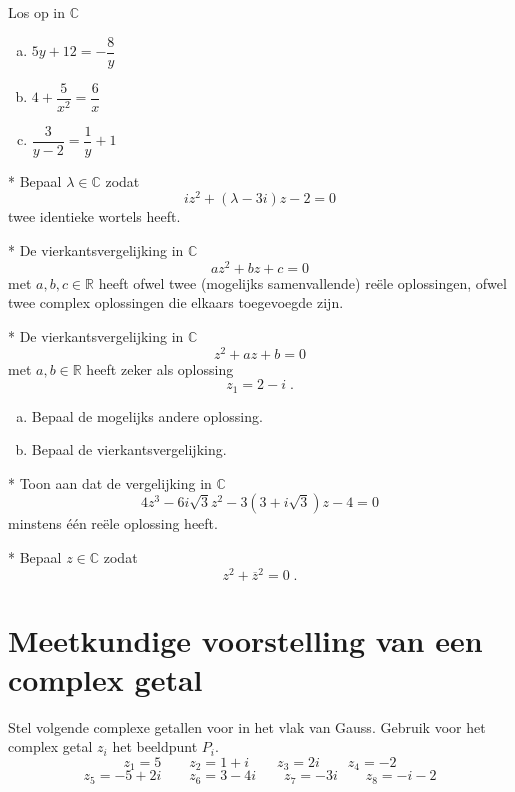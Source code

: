 \documentclass[12pt,twoside]{article}
\begin{document}
\begin{oefening}
Los op in $\mathbb{C}$
  \begin{enumerate}[(a)]
    \itemsep 1em
  \item $5y+12=-\dfrac{8}{y}$
  \item $4+\dfrac{5}{x^2}=\dfrac{6}{x}$
  \item $\dfrac{3}{y-2}=\dfrac{1}{y}+1$
  \end{enumerate}
\end{oefening}

\pagebreak
\begin{oefening}*
  Bepaal $\lambda\in\mathbb{C}$ zodat
  $$iz^2+(\lambda-3i)z-2=0$$
  twee identieke wortels heeft.
\end{oefening}

\begin{oefening}*
De vierkantsvergelijking in $\mathbb{C}$
$$az^2+bz+c=0$$
met $a, b, c \in\mathbb{R}$ heeft ofwel twee (mogelijks samenvallende) reële oplossingen, ofwel twee complex oplossingen die elkaars toegevoegde zijn.
\end{oefening}

\begin{oefening}*
De vierkantsvergelijking in $\mathbb{C}$
$$z^2 + az + b = 0$$
met $a, b \in \mathbb{R}$ heeft zeker als oplossing
$$ z_1=2-i\;.$$
\begin{enumerate}[(a)]
  \item Bepaal de mogelijks andere oplossing.
  \item Bepaal de vierkantsvergelijking.
\end{enumerate}
\end{oefening}

\begin{oefening}*
Toon aan dat de vergelijking in $\mathbb{C}$
$$4z^3-6i\sqrt{3}z^2-3(3+i\sqrt{3})z-4=0$$
minstens één reële oplossing heeft.
\end{oefening}

\begin{oefening}*
Bepaal $z\in\mathbb{C}$ zodat
$$z^2+\overline{z}^2=0\;.$$
\end{oefening}

\pagebreak
\section{Meetkundige voorstelling van een complex getal}

\begin{oefening}
Stel volgende complexe getallen voor in het vlak van Gauss. Gebruik voor het complex getal $z_i$ het beeldpunt $P_i$.
$$z_1=5 \qquad z_2=1+i \qquad  z_3=2i \qquad  z_4=-2$$
$$z_5=-5+2i \qquad  z_6=3-4i \qquad  z_7=-3i \qquad  z_8=-i-2$$
\end{oefening}
\end{document}
